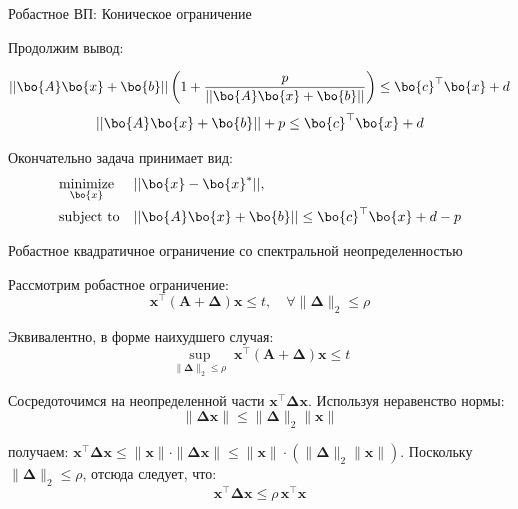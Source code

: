 \documentclass{beamer}
\begin{document}
\begin{frame}{Робастное ВП: Коническое ограничение}
	\begin{flushleft}
		
		Продолжим вывод:
		
		\begin{equation}
			|| \bo{A}\bo{x} + \bo{b}|| \left( 1 + \frac{p}{|| \bo{A}\bo{x} + \bo{b}||} \right) \leq \bo{c}^\top \bo{x} + d
		\end{equation}
		\begin{equation}
			|| \bo{A}\bo{x} + \bo{b}|| + p \leq \bo{c}^\top \bo{x} + d
		\end{equation}
		
		Окончательно задача принимает вид:
		\begin{equation}
			\begin{aligned}
				& \underset{\bo{x}}{\text{minimize}}
				& & ||\bo{x} - \bo{x}^*||, \\
				& \text{subject to}
				& & || \bo{A}\bo{x} + \bo{b}|| \leq \bo{c}^\top \bo{x} + d - p
			\end{aligned}
		\end{equation}
		
	\end{flushleft}
\end{frame}

\begin{frame}{Робастное квадратичное ограничение со спектральной неопределенностью}
	\begin{flushleft}
		
		Рассмотрим робастное ограничение:
		\[
		\mathbf{x}^\top (\mathbf{A} + \mathbf{\Delta}) \mathbf{x} \le t, \quad \forall \|\mathbf{\Delta}\|_2 \le \rho
		\]
		
		
		Эквивалентно, в форме наихудшего случая:
		\[
		\sup_{\|\mathbf{\Delta}\|_2 \le \rho} \; \mathbf{x}^\top (\mathbf{A} + \mathbf{\Delta})\mathbf{x} \le t
		\]
		
		Сосредоточимся на неопределенной части $\mathbf{x}^\top \mathbf{\Delta} \mathbf{x}$. Используя неравенство нормы:
		\[
		\|\mathbf{\Delta} \mathbf{x}\| \le \|\mathbf{\Delta}\|_2 \|\mathbf{x}\|
		\]
		
		получаем: $\mathbf{x}^\top \mathbf{\Delta} \mathbf{x} \le \|\mathbf{x}\| \cdot \|\mathbf{\Delta} \mathbf{x}\|
		\le \|\mathbf{x}\| \cdot (\|\mathbf{\Delta}\|_2 \|\mathbf{x}\|)$. 
		Поскольку \( \|\mathbf{\Delta}\|_2 \le \rho \), отсюда следует, что:
		\[
		\mathbf{x}^\top \mathbf{\Delta} \mathbf{x} \le \rho \, \mathbf{x}^\top \mathbf{x}
		\]
		
	\end{flushleft}
\end{frame}
\end{document}
